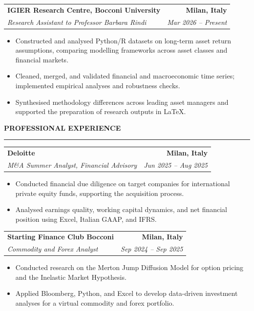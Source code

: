 \documentclass[10pt,letterpaper]{article}
\makeatletter
\newcommand{\cvsection}[1]{%
    \vspace{5pt}%
    {\large\textbf{\MakeUppercase{#1}}}%
    \vspace{2pt}
    \hrule%
    \vspace{5pt}%
}
\newcommand{\cventry}[4]{%
    \vspace{4pt}%
    \noindent
    \begin{tabular*}{\textwidth}{@{}l@{\extracolsep{\fill}}r@{}}
        \large{\textbf{#1}} & \textbf{#2} \\
        \textit{#3} & \textit{#4}
    \end{tabular*}%
    \par\vspace{-2pt}%
}
\newenvironment{cvitems}{%
    \begin{itemize}[
        leftmargin=1.5em,
        itemsep=2pt,
        topsep=5pt,
        parsep=0pt,
        partopsep=0pt
    ]
}{%
    \end{itemize}
}
\makeatother
\begin{document}
\cventry
{IGIER Research Centre, Bocconi University}
{Milan, Italy}
{Research Assistant to Professor Barbara Rindi}
{Mar 2026 -- Present}
\begin{cvitems}

    \item Constructed and analysed Python/R datasets on long-term asset return assumptions, comparing modelling frameworks across asset classes and financial markets.

    \item Cleaned, merged, and validated financial and macroeconomic time series; implemented empirical analyses and robustness checks.

    \item Synthesised methodology differences across leading asset managers and supported the preparation of research outputs in LaTeX.

\end{cvitems}




\cvsection{Professional Experience}

\cventry
{Deloitte}
{Milan, Italy}
{M\&A Summer Analyst, Financial Advisory}
{Jun 2025 -- Aug 2025}
\begin{cvitems}

    \item Conducted financial due diligence on target companies for international private equity funds, supporting the acquisition process.
    
    \item Analysed earnings quality, working capital dynamics, and net financial position using Excel, Italian GAAP, and IFRS.
    
\end{cvitems}

\cventry
{Starting Finance Club Bocconi}
{Milan, Italy}
{Commodity and Forex Analyst}
{Sep 2024 -- Sep 2025}
\begin{cvitems}

    \item Conducted research on the Merton Jump Diffusion Model for option pricing and the Inelastic Market Hypothesis.
    
    \item Applied Bloomberg, Python, and Excel to develop data-driven investment analyses for a virtual commodity and forex portfolio.
    
\end{cvitems}
\end{document}
